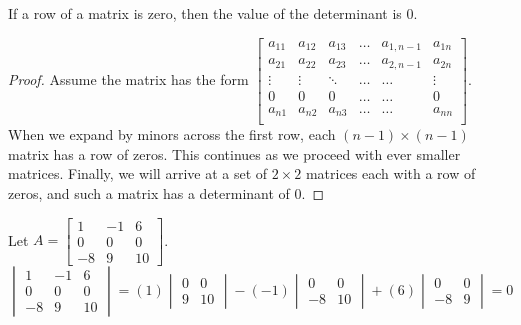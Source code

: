 \documentclass[../main.tex]{subfiles}
\begin{document}
\begin{theorem} \label{th:4_2}
  If a row of a matrix is zero, then the value of the determinant is 0.
  \begin{proof}
  	Assume the matrix has the form
  	\(\begin{bmatrix}
  	  a_{11} & a_{12} & a_{13} & \hdots & a_{1,n-1} & a_{1n}\\
  	  a_{21} & a_{22} & a_{23} & \hdots & a_{2,n-1} & a_{2n}\\
  	  \vdots & \vdots & \ddots & \hdots & \hdots & \vdots\\
  	  0 & 0 & 0 & \hdots & \hdots & 0\\
  	  a_{n1} & a_{n2} & a_{n3} & \hdots & \hdots & a_{nn}\\
  	\end{bmatrix}\).
  	When we expand by minors across the first row, each \((n-1) \times (n-1)\) matrix has a row of zeros. This continues as we proceed with ever smaller matrices. Finally, we will arrive at a set of \(2 \times 2\) matrices each with a row of zeros, and such a matrix has a determinant of 0.
  \end{proof}
\end{theorem}

\begin{example}
  Let \(A =
    \begin{bmatrix}
	  1 & -1 & 6\\
	  0 & 0 & 0\\
	  -8 & 9 & 10
    \end{bmatrix}	    
  \).
  \begin{equation*}
    \begin{vmatrix}
	  1 & -1 & 6\\
	  0 & 0 & 0\\
	  -8 & 9 & 10
    \end{vmatrix}
    =(1)
    \begin{vmatrix}
	  0 & 0\\
	  9 & 10
    \end{vmatrix}
    -(-1)
    \begin{vmatrix}
	  0 & 0\\
	  -8 & 10
    \end{vmatrix}
    +(6)
    \begin{vmatrix}
	  0 & 0\\
	  -8 & 9
    \end{vmatrix}
    =0
  \end{equation*}
\end{example}
\end{document}
